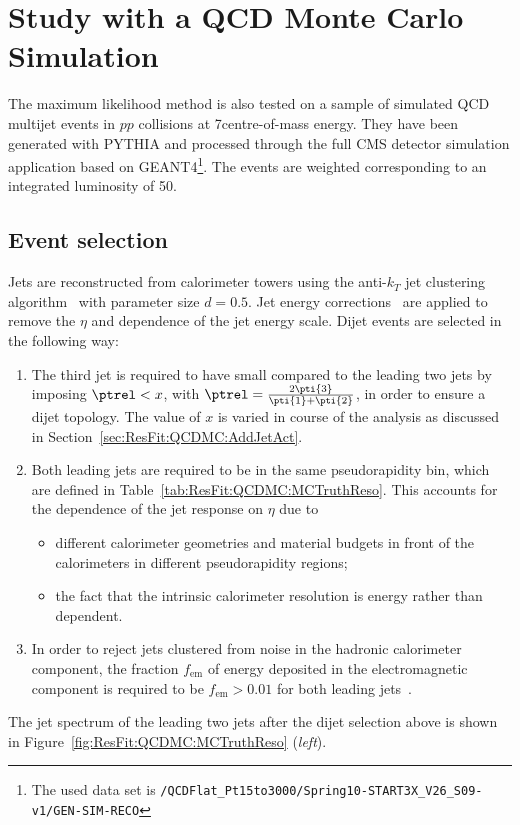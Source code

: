

\section{Study with a QCD Monte Carlo Simulation}\label{sec:ResFit:QCDMC}

The maximum likelihood method is also tested on a sample of simulated QCD multijet events in $pp$ collisions at 7\tev centre-of-mass energy.
They have been generated with PYTHIA and processed through the full CMS detector simulation application based on GEANT4\footnote{The used data set is \texttt{/QCDFlat\_Pt15to3000/Spring10-START3X\_V26\_S09-v1/GEN-SIM-RECO}}.
The events are weighted corresponding to an integrated luminosity of 50\pbinv.


\subsection{Event selection}\label{sec:ResFit:QCDMC:EvtSel}

Jets are reconstructed from calorimeter towers using the anti-$k_{T}$ jet clustering algorithm~\cite{bib:akj} with parameter size $d=0.5$.
Jet energy corrections~\cite{bib:cmspas:jec} are applied to remove the $\eta$ and \pt dependence of the jet energy scale.
Dijet events are selected in the following way:
\begin{enumerate}
\item The third jet is required to have small \pt compared to the leading two jets by imposing \mbox{$\ptrel < x$}, with \mbox{$\ptrel = \frac{2\pti{3}}{\pti{1} + \pti{2}}$}, in order to ensure a dijet topology.
  The value of $x$ is varied in course of the analysis as discussed in Section~\ref{sec:ResFit:QCDMC:AddJetAct}.
\item Both leading jets are required to be in the same pseudorapidity bin, which are defined in Table~\ref{tab:ResFit:QCDMC:MCTruthReso}.
  This accounts for the dependence of the jet \pt response on $\eta$ due to
  \begin{itemize}
  \item different calorimeter geometries and material budgets in front of the calorimeters in different pseudorapidity regions;
  \item the fact that the intrinsic calorimeter resolution is energy rather than \pt dependent.
  \end{itemize}
\item In order to reject jets clustered from noise in the hadronic calorimeter component, the fraction $f_{\text{em}}$ of energy deposited in the electromagnetic component is required to be \mbox{$f_{\text{em}} > 0.01$} for both leading jets~\cite{bib:cmspas:jetid}.
\end{enumerate}
The jet \ptparticle spectrum of the leading two jets after the dijet selection above is shown in Figure~\ref{fig:ResFit:QCDMC:MCTruthReso} (\textit{left}).


